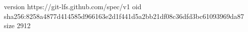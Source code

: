 version https://git-lfs.github.com/spec/v1
oid sha256:8258a4877d414585d966163e2d1f441d5a2bb21df08c36dfd3bc61093969da87
size 2912
